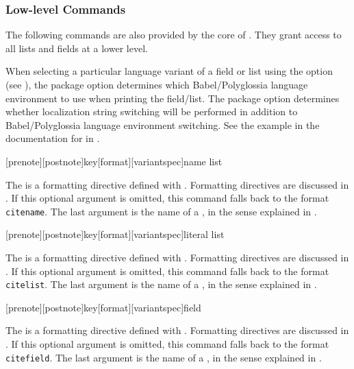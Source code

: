 \documentclass{ltxdockit}[2011/03/25]
\begin{document}
\subsubsection{Low-level Commands}
\label{use:cit:low}

The following commands are also provided by the core of . They grant access to all lists and fields at a lower level.

\BiberOnlyMark When selecting a particular language variant of a field or list using the  option (see ), the  package option determines which Babel/Polyglossia language environment to use when printing the field/list. The  package option determines whether localization string switching will be performed in addition to Babel/Polyglossia language environment switching. See the example in the documentation for  in .

\begin{ltxsyntax}

[prenote][postnote]{key}[format][variantspec]{name list}

The  is a formatting directive defined with . Formatting directives are discussed in . If this optional argument is omitted, this command falls back to the format \texttt{citename}. The last argument is the name of a , in the sense explained in .

[prenote][postnote]{key}[format][variantspec]{literal list}

The  is a formatting directive defined with . Formatting directives are discussed in . If this optional argument is omitted, this command falls back to the format \texttt{citelist}. The last argument is the name of a , in the sense explained in .

[prenote][postnote]{key}[format][variantspec]{field}

The  is a formatting directive defined with . Formatting directives are discussed in . If this optional argument is omitted, this command falls back to the format \texttt{citefield}. The last argument is the name of a , in the sense explained in .

\end{ltxsyntax}
\end{document}
